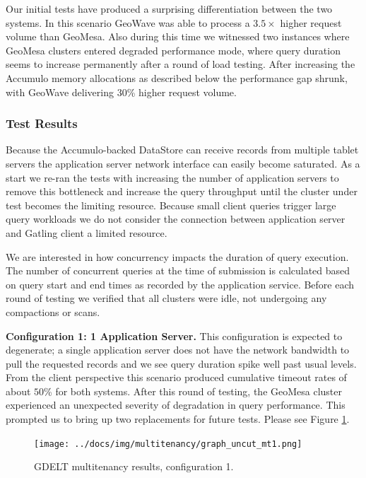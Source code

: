 Our initial tests have produced a surprising differentiation between the two systems.
In this scenario GeoWave was able to process a $3.5 \times$ higher request volume than GeoMesa.
Also during this time we witnessed two instances where GeoMesa clusters entered degraded performance mode,
where query duration seems to increase permanently after a round of load testing.
After increasing the Accumulo memory allocations as described below the performance gap shrunk, with GeoWave delivering $30$\% higher request volume.

\subsubsection{Test Results}

Because the Accumulo-backed DataStore can receive records from multiple tablet servers the application server network interface can easily become saturated.
As a start we re-ran the tests with increasing the number of application servers to remove this bottleneck and increase the query throughput until the cluster under test becomes the limiting resource.
Because small client queries trigger large query workloads we do not consider the connection between application server and Gatling client a limited resource.

We are interested in how concurrency impacts the duration of query execution.
The number of concurrent queries at the time of submission is calculated based on query start and end times as recorded by the application service.
Before each round of testing we verified that all clusters were idle, not undergoing any compactions or scans.

{\bf Configuration 1: 1 Application Server.}
This configuration is expected to degenerate; a single application server does not have the network bandwidth to pull the requested records and we see query duration spike well past usual levels.
From the client perspective this scenario produced cumulative timeout rates of about $50$\% for both systems.
After this round of testing, the GeoMesa cluster experienced an unexpected severity of degradation in query performance.
This prompted us to bring up two replacements for future tests.
Please see Figure \ref{config1}.

\begin{figure}[h!tb]
  \centering
  \texttt{[image: ../docs/img/multitenancy/graph\_uncut\_mt1.png]}
  \caption{GDELT multitenancy results, configuration 1.}
  \label{config1}
\end{figure}

